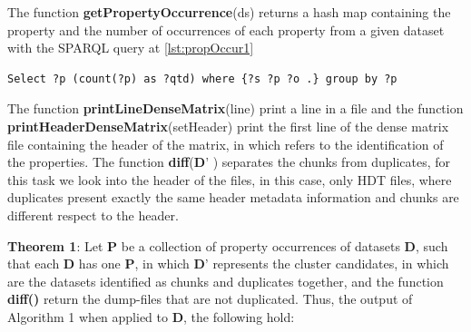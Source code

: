 
The function \textbf{getPropertyOccurrence}(ds) returns a hash map containing the property and the number of occurrences of each property from a given dataset with the SPARQL query at \cref{lst:propOccur1} 

\begin{lstlisting}[language=SPARQL, label={lst:propOccur1}, caption=Property occurrence query.]
Select ?p (count(?p) as ?qtd) where {?s ?p ?o .} group by ?p
\end{lstlisting}
The function \textbf{printLineDenseMatrix}(line) print a line in a file and the function \textbf{printHeaderDenseMatrix}(setHeader) print the first line of the dense matrix file containing the header of the matrix, in which refers to the identification of the properties.
The function \textbf{diff}($\mathbf{D’}$ ) separates the chunks from duplicates, for this task we look into the header of the files, in this case, only HDT files, where duplicates present exactly the same header metadata information and chunks are different respect to the header.

\textbf{Theorem 1}: Let $\mathbf{P}$ be a collection of property occurrences of datasets $\mathbf{D}$, such that each $\mathbf{D}$ has one $\mathbf{P}$, in which $\mathbf{D’}$ represents the cluster candidates, in which are the datasets identified as chunks and duplicates together, and the function \textbf{diff()} return the dump-files that are not duplicated. Thus, the output of Algorithm 1 when applied to $\mathbf{D}$, the following hold:

